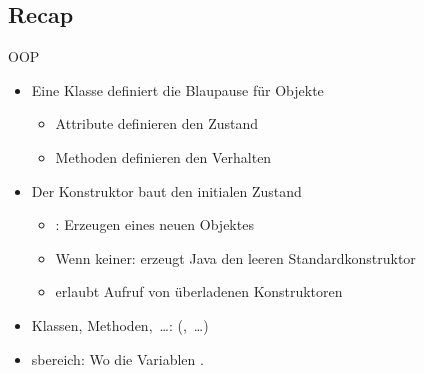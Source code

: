 {\subsection{Recap}
\begin{frame}[c]{\hfill OOP}
\begin{itemize}[<+(1)->]
   \itemsep18pt
   \item Eine Klasse definiert die Blaupause für Objekte \begin{itemize}
      \item Attribute definieren den Zustand
      \item Methoden definieren den Verhalten
   \end{itemize}
   \item Der Konstruktor baut den initialen Zustand \begin{itemize}
      \item {}: Erzeugen eines neuen Objektes
      \item Wenn keiner: erzeugt Java den leeren Standardkonstruktor
      \item {} erlaubt Aufruf von überladenen Konstruktoren
   \end{itemize}
   \item Klassen, Methoden,~\ldots:\hfill {}  (,~\ldots)
   \item {}sbereich: Wo die Variablen .
\end{itemize}
\LargeSide
\end{frame}


}
